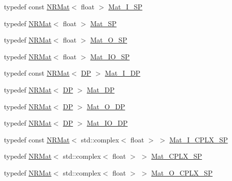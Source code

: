 \begin{DoxyCompactItemize}
\item 
typedef const \mbox{\hyperlink{classNR_1_1NRMat}{N\+R\+Mat}}$<$ float $>$ \mbox{\hyperlink{namespaceNR_a061a8b183608807da47c75755802abfd}{Mat\+\_\+\+I\+\_\+\+SP}}
\item 
typedef \mbox{\hyperlink{classNR_1_1NRMat}{N\+R\+Mat}}$<$ float $>$ \mbox{\hyperlink{namespaceNR_aa22c72001d6a0e18146f41e98b9a33af}{Mat\+\_\+\+SP}}
\item 
typedef \mbox{\hyperlink{classNR_1_1NRMat}{N\+R\+Mat}}$<$ float $>$ \mbox{\hyperlink{namespaceNR_a1f43923ad3dc2cee2dc76f0af4dc1ad3}{Mat\+\_\+\+O\+\_\+\+SP}}
\item 
typedef \mbox{\hyperlink{classNR_1_1NRMat}{N\+R\+Mat}}$<$ float $>$ \mbox{\hyperlink{namespaceNR_a1003f2aa49b4cba93bf437a81133c9f4}{Mat\+\_\+\+I\+O\+\_\+\+SP}}
\item 
typedef const \mbox{\hyperlink{classNR_1_1NRMat}{N\+R\+Mat}}$<$ \mbox{\hyperlink{namespaceNR_af6ff762dd605ff477b8e52387253a02a}{DP}} $>$ \mbox{\hyperlink{namespaceNR_a2b8abfda8fffad6ba0a1b5a4c0773dbf}{Mat\+\_\+\+I\+\_\+\+DP}}
\item 
typedef \mbox{\hyperlink{classNR_1_1NRMat}{N\+R\+Mat}}$<$ \mbox{\hyperlink{namespaceNR_af6ff762dd605ff477b8e52387253a02a}{DP}} $>$ \mbox{\hyperlink{namespaceNR_afeedcf8f11ce39a2c83aefe0253cbbda}{Mat\+\_\+\+DP}}
\item 
typedef \mbox{\hyperlink{classNR_1_1NRMat}{N\+R\+Mat}}$<$ \mbox{\hyperlink{namespaceNR_af6ff762dd605ff477b8e52387253a02a}{DP}} $>$ \mbox{\hyperlink{namespaceNR_adc1f8da33094b6bbeb1f5f899515ce54}{Mat\+\_\+\+O\+\_\+\+DP}}
\item 
typedef \mbox{\hyperlink{classNR_1_1NRMat}{N\+R\+Mat}}$<$ \mbox{\hyperlink{namespaceNR_af6ff762dd605ff477b8e52387253a02a}{DP}} $>$ \mbox{\hyperlink{namespaceNR_ad1513aa4697878ed3bff0b8b3c9dd910}{Mat\+\_\+\+I\+O\+\_\+\+DP}}
\item 
typedef const \mbox{\hyperlink{classNR_1_1NRMat}{N\+R\+Mat}}$<$ std\+::complex$<$ float $>$ $>$ \mbox{\hyperlink{namespaceNR_a0ef9291e459694a91295db095287e78b}{Mat\+\_\+\+I\+\_\+\+C\+P\+L\+X\+\_\+\+SP}}
\item 
typedef \mbox{\hyperlink{classNR_1_1NRMat}{N\+R\+Mat}}$<$ std\+::complex$<$ float $>$ $>$ \mbox{\hyperlink{namespaceNR_accbf3fece80df76410b863e2cb7d2567}{Mat\+\_\+\+C\+P\+L\+X\+\_\+\+SP}}
\item 
typedef \mbox{\hyperlink{classNR_1_1NRMat}{N\+R\+Mat}}$<$ std\+::complex$<$ float $>$ $>$ \mbox{\hyperlink{namespaceNR_a591476e0092fbdc3941716455dfe1391}{Mat\+\_\+\+O\+\_\+\+C\+P\+L\+X\+\_\+\+SP}}

\end{DoxyCompactItemize}

